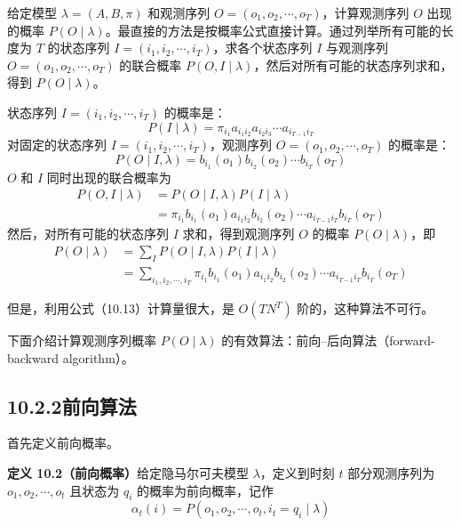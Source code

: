 \documentclass[UTF8, 12pt, fontset=fandol, oneside]{ctexart}
\begin{document}
给定模型 $\lambda=(A,B,\pi)$ 和观测序列 $O=(o_1,o_2,\cdots,o_T)$，计算观测序列 $O$ 出现的概率 $P(O\mid\lambda)$。最直接的方法是按概率公式直接计算。通过列举所有可能的长度为 $T$ 的状态序列 $I=(i_1,i_2,\cdots,i_T)$，求各个状态序列 $I$ 与观测序列 $O=(o_1,o_2,\cdots,o_T)$ 的联合概率 $P(O,I\mid\lambda)$，然后对所有可能的状态序列求和，得到 $P(O\mid\lambda)$。

状态序列 $I=(i_1,i_2,\cdots,i_T)$ 的概率是：
\begin{equation}
  P(I\mid\lambda)=\pi_{i_1}a_{i_1i_2}a_{i_2i_3}\cdots a_{i_{T-1}i_T}
  \tag{10.10}
\end{equation}
对固定的状态序列 $I=(i_1,i_2,\cdots,i_T)$，观测序列 $O=(o_1,o_2,\cdots,o_T)$ 的概率是：
\begin{equation}
  P(O\mid I,\lambda)=b_{i_1}(o_1)b_{i_2}(o_2)\cdots b_{i_T}(o_T)
  \tag{10.11}
\end{equation}
$O$ 和 $I$ 同时出现的联合概率为
\begin{equation}
\begin{aligned}
  P(O,I\mid\lambda)
  &=P(O\mid I,\lambda)P(I\mid\lambda)\\
  &=\pi_{i_1}b_{i_1}(o_1)a_{i_1i_2}b_{i_2}(o_2)\cdots a_{i_{T-1}i_T}b_{i_T}(o_T)
\end{aligned}
  \tag{10.12}
\end{equation}
然后，对所有可能的状态序列 $I$ 求和，得到观测序列 $O$ 的概率 $P(O\mid\lambda)$，即
\begin{equation}
\begin{aligned}
  P(O\mid\lambda)
  &=\sum_I P(O\mid I,\lambda)P(I\mid\lambda)\\
  &=\sum_{i_1,i_2,\cdots,i_T}\pi_{i_1}b_{i_1}(o_1)a_{i_1i_2}b_{i_2}(o_2)\cdots a_{i_{T-1}i_T}b_{i_T}(o_T)
\end{aligned}
  \tag{10.13}
\end{equation}

但是，利用公式（10.13）计算量很大，是 $O(TN^T)$ 阶的，这种算法不可行。

下面介绍计算观测序列概率 $P(O\mid\lambda)$ 的有效算法：前向--后向算法（forward-backward algorithm）。

\subsection*{10.2.2\quad 前向算法}

首先定义前向概率。

\noindent\textbf{定义 10.2（前向概率）}\quad 给定隐马尔可夫模型 $\lambda$，定义到时刻 $t$ 部分观测序列为 $o_1,o_2,\cdots,o_t$ 且状态为 $q_i$ 的概率为前向概率，记作
\begin{equation}
  \alpha_t(i)=P(o_1,o_2,\cdots,o_t,i_t=q_i\mid\lambda)
  \tag{10.14}
\end{equation}
\end{document}
